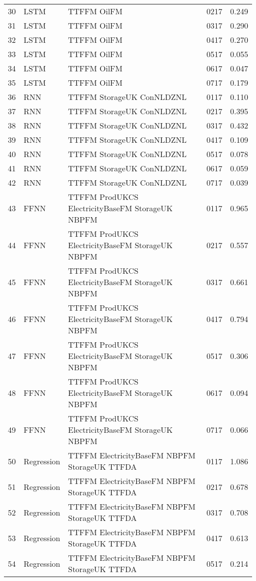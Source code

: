\begin{table}[ht]
\begin{tabular}{rlllr}
  30 & LSTM & TTFFM OilFM & 0217 & 0.249 \\ 
  31 & LSTM & TTFFM OilFM & 0317 & 0.290 \\ 
  32 & LSTM & TTFFM OilFM & 0417 & 0.270 \\ 
  33 & LSTM & TTFFM OilFM & 0517 & 0.055 \\ 
  34 & LSTM & TTFFM OilFM & 0617 & 0.047 \\ 
  35 & LSTM & TTFFM OilFM & 0717 & 0.179 \\ 
  36 & RNN & TTFFM StorageUK ConNLDZNL & 0117 & 0.110 \\ 
  37 & RNN & TTFFM StorageUK ConNLDZNL & 0217 & 0.395 \\ 
  38 & RNN & TTFFM StorageUK ConNLDZNL & 0317 & 0.432 \\ 
  39 & RNN & TTFFM StorageUK ConNLDZNL & 0417 & 0.109 \\ 
  40 & RNN & TTFFM StorageUK ConNLDZNL & 0517 & 0.078 \\ 
  41 & RNN & TTFFM StorageUK ConNLDZNL & 0617 & 0.059 \\ 
  42 & RNN & TTFFM StorageUK ConNLDZNL & 0717 & 0.039 \\ 
  43 & FFNN & TTFFM ProdUKCS ElectricityBaseFM StorageUK NBPFM & 0117 & 0.965 \\ 
  44 & FFNN & TTFFM ProdUKCS ElectricityBaseFM StorageUK NBPFM & 0217 & 0.557 \\ 
  45 & FFNN & TTFFM ProdUKCS ElectricityBaseFM StorageUK NBPFM & 0317 & 0.661 \\ 
  46 & FFNN & TTFFM ProdUKCS ElectricityBaseFM StorageUK NBPFM & 0417 & 0.794 \\ 
  47 & FFNN & TTFFM ProdUKCS ElectricityBaseFM StorageUK NBPFM & 0517 & 0.306 \\ 
  48 & FFNN & TTFFM ProdUKCS ElectricityBaseFM StorageUK NBPFM & 0617 & 0.094 \\ 
  49 & FFNN & TTFFM ProdUKCS ElectricityBaseFM StorageUK NBPFM & 0717 & 0.066 \\ 
  50 & Regression & TTFFM ElectricityBaseFM NBPFM StorageUK TTFDA & 0117 & 1.086 \\ 
  51 & Regression & TTFFM ElectricityBaseFM NBPFM StorageUK TTFDA & 0217 & 0.678 \\ 
  52 & Regression & TTFFM ElectricityBaseFM NBPFM StorageUK TTFDA & 0317 & 0.708 \\ 
  53 & Regression & TTFFM ElectricityBaseFM NBPFM StorageUK TTFDA & 0417 & 0.613 \\ 
  54 & Regression & TTFFM ElectricityBaseFM NBPFM StorageUK TTFDA & 0517 & 0.214 \\ 

\end{tabular}
\end{table}
